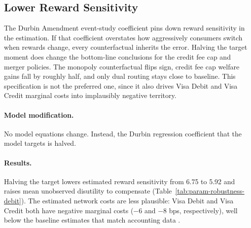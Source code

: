 \documentclass[main.tex]{subfiles}
\begin{document}
\clearpage


\subsection{Lower Reward Sensitivity}
\label{subsec:oa-debit-robustness}

The Durbin Amendment event-study coefficient pins down reward sensitivity in the estimation.
If that coefficient overstates how aggressively consumers switch when rewards change, every counterfactual inherits the error.
Halving the target moment does change the bottom-line conclusions for the credit fee cap and merger policies.
The monopoly counterfactual flips sign, credit fee cap welfare gains fall by roughly half, and only dual routing stays close to baseline.
This specification is not the preferred one, since it also drives Visa Debit and Visa Credit marginal costs into implausibly negative territory.

\paragraph{Model modification.} No model equations change.
Instead, the Durbin regression coefficient that the model targets is halved.

\paragraph{Results.} Halving the target lowers estimated reward sensitivity from 6.75 to 5.92 and raises mean unobserved disutility to compensate (Table~\ref{tab:param-robustness-debit}).
The estimated network costs are less plausible: Visa Debit and Visa Credit both have negative marginal costs ($-6$ and $-8$ bps, respectively), well below the baseline estimates that match accounting data \parencite{Lowe2005, Mukharlyamov.Sarin2025, NACHA2017, Visa2020}.
\end{document}
